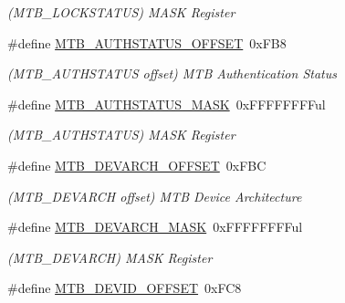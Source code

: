 \begin{DoxyCompactItemize}
\begin{DoxyCompactList}\small\item\em (M\+T\+B\+\_\+\+L\+O\+C\+K\+S\+T\+A\+T\+U\+S) M\+A\+S\+K Register \end{DoxyCompactList}\item 
\hypertarget{group___s_a_m_l21___m_t_b_ga0958bb6ff58fa5cf43ee41739fe6979b}{}\#define \hyperlink{group___s_a_m_l21___m_t_b_ga0958bb6ff58fa5cf43ee41739fe6979b}{M\+T\+B\+\_\+\+A\+U\+T\+H\+S\+T\+A\+T\+U\+S\+\_\+\+O\+F\+F\+S\+E\+T}~0x\+F\+B8\label{group___s_a_m_l21___m_t_b_ga0958bb6ff58fa5cf43ee41739fe6979b}

\begin{DoxyCompactList}\small\item\em (M\+T\+B\+\_\+\+A\+U\+T\+H\+S\+T\+A\+T\+U\+S offset) M\+T\+B Authentication Status \end{DoxyCompactList}\item 
\hypertarget{group___s_a_m_l21___m_t_b_gaea4ff98accd4f231bc421f0604013c4c}{}\#define \hyperlink{group___s_a_m_l21___m_t_b_gaea4ff98accd4f231bc421f0604013c4c}{M\+T\+B\+\_\+\+A\+U\+T\+H\+S\+T\+A\+T\+U\+S\+\_\+\+M\+A\+S\+K}~0x\+F\+F\+F\+F\+F\+F\+F\+Ful\label{group___s_a_m_l21___m_t_b_gaea4ff98accd4f231bc421f0604013c4c}

\begin{DoxyCompactList}\small\item\em (M\+T\+B\+\_\+\+A\+U\+T\+H\+S\+T\+A\+T\+U\+S) M\+A\+S\+K Register \end{DoxyCompactList}\item 
\hypertarget{group___s_a_m_l21___m_t_b_ga559db03301afdc97a00b560f8169de48}{}\#define \hyperlink{group___s_a_m_l21___m_t_b_ga559db03301afdc97a00b560f8169de48}{M\+T\+B\+\_\+\+D\+E\+V\+A\+R\+C\+H\+\_\+\+O\+F\+F\+S\+E\+T}~0x\+F\+B\+C\label{group___s_a_m_l21___m_t_b_ga559db03301afdc97a00b560f8169de48}

\begin{DoxyCompactList}\small\item\em (M\+T\+B\+\_\+\+D\+E\+V\+A\+R\+C\+H offset) M\+T\+B Device Architecture \end{DoxyCompactList}\item 
\hypertarget{group___s_a_m_l21___m_t_b_ga39b932be70b072fab63541b0424e3176}{}\#define \hyperlink{group___s_a_m_l21___m_t_b_ga39b932be70b072fab63541b0424e3176}{M\+T\+B\+\_\+\+D\+E\+V\+A\+R\+C\+H\+\_\+\+M\+A\+S\+K}~0x\+F\+F\+F\+F\+F\+F\+F\+Ful\label{group___s_a_m_l21___m_t_b_ga39b932be70b072fab63541b0424e3176}

\begin{DoxyCompactList}\small\item\em (M\+T\+B\+\_\+\+D\+E\+V\+A\+R\+C\+H) M\+A\+S\+K Register \end{DoxyCompactList}\item 
\hypertarget{group___s_a_m_l21___m_t_b_gaab7147dd924e18946637db8903a1aff6}{}\#define \hyperlink{group___s_a_m_l21___m_t_b_gaab7147dd924e18946637db8903a1aff6}{M\+T\+B\+\_\+\+D\+E\+V\+I\+D\+\_\+\+O\+F\+F\+S\+E\+T}~0x\+F\+C8\label{group___s_a_m_l21___m_t_b_gaab7147dd924e18946637db8903a1aff6}


\end{DoxyCompactItemize}
